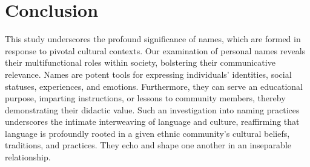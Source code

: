 \documentclass[output=paper,colorlinks,citecolor=brown]{langscibook}
\begin{document}
\section{Conclusion} \label{SEC-Conclusion}

This study underscores the profound significance of names, which are formed in response to pivotal cultural contexts. Our examination of personal names reveals their multifunctional roles within society, bolstering their communicative relevance. Names are potent tools for expressing individuals' identities, social statuses, experiences, and emotions. Furthermore, they can serve an educational purpose, imparting instructions, or lessons to community members, thereby demonstrating their didactic value. Such an investigation into naming practices underscores the intimate interweaving of language and culture, reaffirming that language is profoundly rooted in a given ethnic community's cultural beliefs, traditions, and practices. They echo and shape one another in an inseparable relationship.



{\sloppy\printbibliography[heading=subbibliography,notkeyword=this]}
\end{document}
